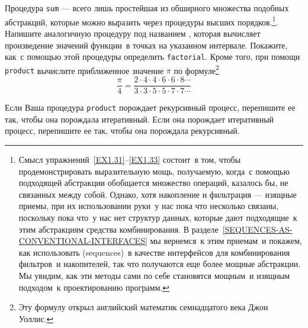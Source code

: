 \begin{exercise}[]{1.31}\label{EX1.31}%
\begin{plainenum}
\item
Процедура {\tt sum} --- всего лишь
простейшая из обширного множества подобных абстракций, которые можно
выразить через процедуры высших порядков.\footnote{Смысл упражнений~\ref{EX1.31}--\ref{EX1.33} состоит~в том, чтобы
продемонстрировать выразительную мощь, получаемую, когда~с помощью подходящей абстракции
обобщается множество операций, казалось бы, не связанных между собой.  Однако, хотя накопление и
фильтрация --- изящные приемы, при их использовании руки~у нас пока что 
несколько связаны, поскольку пока что~у нас нет структур данных,
которые дают подходящие~к этим абстракциям средства комбинирования. В 
разделе~\ref{SEQUENCES-AS-CONVENTIONAL-INTERFACES} мы
вернемся~к этим приемам~и покажем, как использовать 
 (sequences)~в качестве
интерфейсов для комбинирования  фильтров~и накопителей, так что
получаются еще более мощные абстракции.  Мы увидим, как эти методы
сами по себе становятся мощным~и изящным подходом~к проектированию
программ.}.
Напишите аналогичную процедуру под названием ,
которая вычисляет произведение значений функции~в точках на указанном
интервале.  Покажите, как~с помощью этой процедуры определить
{\tt factorial}.
Кроме того, при помощи {\tt product}
вычислите приближенное значение $\pi$ по формуле\footnote{Эту формулу открыл английский математик семнадцатого
века Джон Уоллис.} 
$$
\dfrac{\pi}{4} = \dfrac{2 \cdot 4 \cdot 4 \cdot 6 \cdot 6 \cdot 8 \cdots}
                     {3 \cdot 3 \cdot 5 \cdot 5 \cdot 7 \cdot 7 \cdots}
$$
\item
Если Ваша процедура {\tt product} порождает
рекурсивный процесс, перепишите ее так, чтобы она порождала
итеративный.  Если она порождает итеративный процесс,
перепишите ее так, чтобы она порождала рекурсивный.
\end{plainenum}
\end{exercise}
